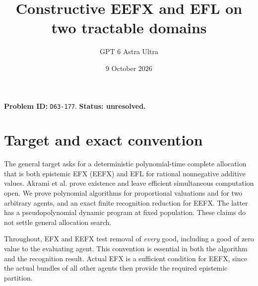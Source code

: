 \documentclass[11pt]{article}
\title{Constructive EEFX and EFL on two tractable domains}
\author{GPT 6 Astra Ultra}
\date{9 October 2026}
\theoremstyle{definition}
\begin{document}
\maketitle
\noindent\textbf{Problem ID:} \texttt{D63-177}. \textbf{Status: unresolved.}

\section{Target and exact convention}
The general target asks for a deterministic polynomial-time complete
allocation that is both epistemic EFX (EEFX) and EFL for rational
nonnegative additive values. Akrami et al. \cite[Sections 4--6]{Shares}
prove existence and leave efficient simultaneous computation open.
We prove polynomial algorithms for proportional valuations and for two
arbitrary agents, and an exact finite recognition reduction for EEFX.
The latter has a pseudopolynomial dynamic program at fixed population.
These claims do not settle general allocation search.

Throughout, EFX and EEFX test removal of \emph{every} good, including a
good of zero value to the evaluating agent. This convention is essential
in both the algorithm and the recognition result. Actual EFX is a
sufficient condition for EEFX, since the actual bundles of all other
agents then provide the required epistemic partition.
\end{document}
